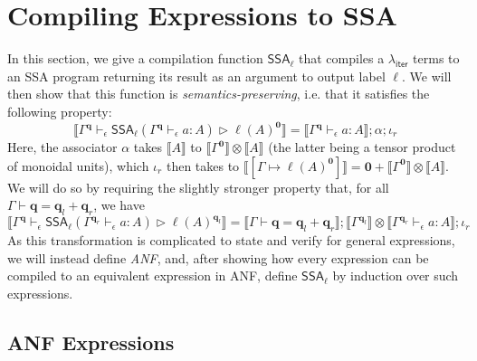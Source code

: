 \documentclass[acmsmall,screen,anonymous,review]{acmart}
\newcounter{todos}
\newcommand{\TODO}[1]{{
  \stepcounter{todos}
  \begin{center}\large{\textcolor{red}{\textbf{TODO \arabic{todos}:} #1}}\end{center}
}}
\newcommand{\mb}[1]{\ensuremath{\mathbf{#1}}}
\newcommand{\ms}[1]{\ensuremath{\mathsf{#1}}}
\newcommand{\lto}{:}
\newcommand{\wbranch}[3]{#1(#2) \lto \{#3\}}
\newcommand{\qsp}[4]{#1 \vdash #2 = #3 + #4}
\newcommand{\hasty}[4]{#1 \vdash_{#2} #3: {#4}}
\newcommand{\haslb}[4]{#1 \vdash_{#2} #3 \rhd #4}
\newcommand{\tossa}[2]{\ms{SSA}_{#1}(#2)}
\newcommand{\ltoty}[2]{[#1 \mapsto #2]}
\newcommand{\dnt}[1]{\llbracket{#1}\rrbracket}
\newcommand{\subiterexp}{\texorpdfstring{\(\lambda_{\ms{iter}}\)}{lambda-iter}}
\newcommand{\isotopessa}{\(\lambda_{\ms{SSA}}\)}
\begin{document}



\section{Compiling Expressions to SSA}

\label{apx:ssa-roundtrip}

In this section, we give a compilation function $\ms{SSA}_\ell$ that compiles a \subiterexp{} terms 
to an SSA program returning its result as an argument to output label $\ell$. We will then show
that this function is \emph{semantics-preserving}, i.e. that it satisfies the following property:
$$
\dnt{
  \haslb{\Gamma^{\mb{q}}}{\epsilon}{\tossa{\ell}{\hasty{\Gamma^{\mb{q}}}{\epsilon}{a}{A}}}
  {\ell(A)^{\mb{0}}}
} = \dnt{\hasty{\Gamma^{\mb{q}}}{\epsilon}{a}{A}} ; \alpha ; \iota_r
$$
Here, the associator $\alpha$ takes $\dnt{A}$ to $\dnt{\Gamma^{\mb{0}}} \otimes \dnt{A}$ (the latter
being a tensor product of monoidal units), which $\iota_r$ then takes to
$\dnt{\ltoty{\Gamma}{\ell(A)^{\mb{0}}}} = \mb{0} + \dnt{\Gamma^{\mb{0}}} \otimes \dnt{A}$. We will
do so by requiring the slightly stronger property that, for all
$\qsp{\Gamma}{\mb{q}}{\mb{q}_l}{\mb{q}_r}$, we have
$$
  \dnt{
    \haslb{\Gamma^{\mb{q}}}{\epsilon}{\tossa{\ell}{\hasty{\Gamma^{\mb{q}_r}}{\epsilon}{a}{A}}}
    {\ell(A)^{\mb{q}_l}}
  } 
  = \dnt{\qsp{\Gamma}{\mb{q}}{\mb{q}_l}{\mb{q}_r}}
  ; \dnt{\Gamma^{\mb{q}_l}} \otimes \dnt{\hasty{\Gamma^{\mb{q}_r}}{\epsilon}{a}{A}} 
  ; \iota_r
$$ 
As this transformation is complicated to state and verify for general expressions, we will instead
define \emph{ANF}, and, after showing how every expression can be compiled to an equivalent
expression in ANF, define $\ms{SSA}_\ell$ by induction over such expressions.

\subsection{ANF Expressions}
\end{document}
